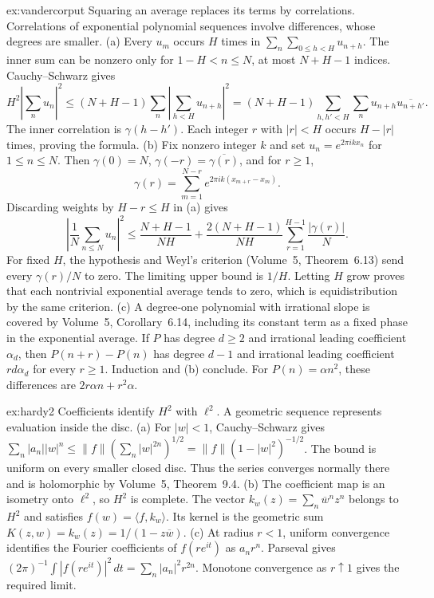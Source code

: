 \begin{solution}{ex:vandercorput}
\idea Squaring an average replaces its terms by correlations. Correlations of exponential polynomial sequences involve differences, whose degrees are smaller.
\writeup (a) Every $u_m$ occurs $H$ times in $\sum_n\sum_{0\le h<H}u_{n+h}$. The inner sum can be nonzero only for $1-H<n\le N$, at most $N+H-1$ indices. Cauchy--Schwarz gives
\[H^2\left|\sum_nu_n\right|^2\le(N+H-1)\sum_n\left|\sum_{h<H}u_{n+h}\right|^2=(N+H-1)\sum_{h,h'<H}\sum_nu_{n+h}\overline{u_{n+h'}}.\]
The inner correlation is $\gamma(h-h')$. Each integer $r$ with $|r|<H$ occurs $H-|r|$ times, proving the formula. (b) Fix nonzero integer $k$ and set $u_n=e^{2\pi ikx_n}$ for $1\le n\le N$. Then $\gamma(0)=N$, $\gamma(-r)=\overline{\gamma(r)}$, and for $r\ge1$,
\[\gamma(r)=\sum_{m=1}^{N-r}e^{2\pi ik(x_{m+r}-x_m)}.\]
Discarding weights by $H-r\le H$ in (a) gives
\[\left|\frac1N\sum_{n\le N}u_n\right|^2\le\frac{N+H-1}{NH}+\frac{2(N+H-1)}{NH}\sum_{r=1}^{H-1}\frac{|\gamma(r)|}N.\]
For fixed $H$, the hypothesis and Weyl's criterion (Volume~5, Theorem~6.13) send every $\gamma(r)/N$ to zero. The limiting upper bound is $1/H$. Letting $H$ grow proves that each nontrivial exponential average tends to zero, which is equidistribution by the same criterion. (c) A degree-one polynomial with irrational slope is covered by Volume~5, Corollary~6.14, including its constant term as a fixed phase in the exponential average. If $P$ has degree $d\ge2$ and irrational leading coefficient $\alpha_d$, then $P(n+r)-P(n)$ has degree $d-1$ and irrational leading coefficient $rd\alpha_d$ for every $r\ge1$. Induction and (b) conclude. For $P(n)=\alpha n^2$, these differences are $2r\alpha n+r^2\alpha$.
\end{solution}
\begin{solution}{ex:hardy2}
\idea Coefficients identify $H^2$ with $\ell^2$. A geometric sequence represents evaluation inside the disc.
\writeup (a) For $|w|<1$, Cauchy--Schwarz gives $\sum_n|a_n||w|^n\le\|f\|(\sum_n|w|^{2n})^{1/2}=\|f\|(1-|w|^2)^{-1/2}$. The bound is uniform on every smaller closed disc. Thus the series converges normally there and is holomorphic by Volume~5, Theorem~9.4. (b) The coefficient map is an isometry onto $\ell^2$, so $H^2$ is complete. The vector $k_w(z)=\sum_n\overline w^nz^n$ belongs to $H^2$ and satisfies $f(w)=\langle f,k_w\rangle$. Its kernel is the geometric sum $K(z,w)=k_w(z)=1/(1-z\overline w)$. (c) At radius $r<1$, uniform convergence identifies the Fourier coefficients of $f(re^{it})$ as $a_nr^n$. Parseval gives $(2\pi)^{-1}\int|f(re^{it})|^2\,dt=\sum_n|a_n|^2r^{2n}$. Monotone convergence as $r\uparrow1$ gives the required limit.
\end{solution}
